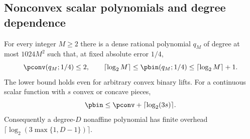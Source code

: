 \subsection{Nonconvex scalar polynomials and degree dependence}

\begin{theorem}
\label{thm:nonconvex-gap}
For every integer $M\ge2$ there is a dense rational polynomial $q_M$
of degree at most $1024M^2$ such that, at fixed absolute error $1/4$,
\begin{equation}\label{eq:nonconvex-gap-counts}
 \pconv(q_M;1/4)\le2,\qquad
 \lceil\log_2M\rceil\le\pbin(q_M;1/4)
 \le\lceil\log_2M\rceil+1.
\end{equation}
The lower bound holds even for arbitrary convex binary lifts.
For a continuous scalar function with $s$ convex or concave pieces,
\begin{equation}\label{eq:convexity-piece-bound}
 \pbin\le\pconv+\lceil\log_2(3s)\rceil.
\end{equation}
Consequently a degree-$D$ nonaffine polynomial has finite overhead
$\lceil\log_2(3\max\{1,D-1\})\rceil$.
\end{theorem}
